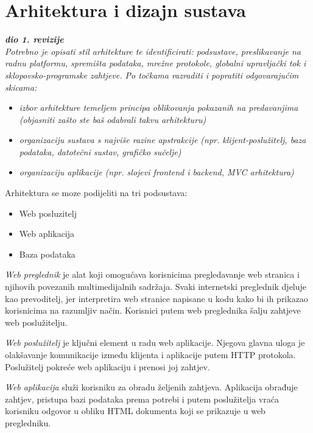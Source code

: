 \chapter{Arhitektura i dizajn sustava}
		
		\textbf{\textit{dio 1. revizije}}\\

		\textit{ Potrebno je opisati stil arhitekture te identificirati: podsustave, preslikavanje na radnu platformu, spremišta podataka, mrežne protokole, globalni upravljački tok i sklopovsko-programske zahtjeve. Po točkama razraditi i popratiti odgovarajućim skicama:}
	\begin{itemize}
		\item 	\textit{izbor arhitekture temeljem principa oblikovanja pokazanih na predavanjima (objasniti zašto ste baš odabrali takvu arhitekturu)}
		\item 	\textit{organizaciju sustava s najviše razine apstrakcije (npr. klijent-poslužitelj, baza podataka, datotečni sustav, grafičko sučelje)}
		\item 	\textit{organizaciju aplikacije (npr. slojevi frontend i backend, MVC arhitektura) }		
	\end{itemize}

	Arhitektura se moze podijeliti na tri podsustava:
	
	\begin{itemize}
		\item Web posluzitelj
		\item Web aplikacija
		\item Baza podataka
	\end{itemize}

	
	\textit{Web preglednik} je alat koji omogućava korisnicima pregledavanje web stranica i njihovih povezanih multimedijalnih sadržaja. Svaki internetski preglednik djeluje kao prevoditelj, jer interpretira web stranice napisane u kodu kako bi ih prikazao korisnicima na razumljiv način. Korisnici putem web preglednika šalju zahtjeve web poslužitelju.
	
	\textit{Web poslužitelj} je ključni element u radu web aplikacije. Njegova glavna uloga je olakšavanje komunikacije između klijenta i aplikacije putem HTTP protokola. Poslužitelj pokreće web aplikaciju i prenosi joj zahtjev.
	
	\textit{Web aplikacija} služi korisniku za obradu željenih zahtjeva. Aplikacija obrađuje zahtjev, pristupa bazi podataka prema potrebi i putem poslužitelja vraća korisniku odgovor u obliku HTML dokumenta koji se prikazuje u web pregledniku.
	
